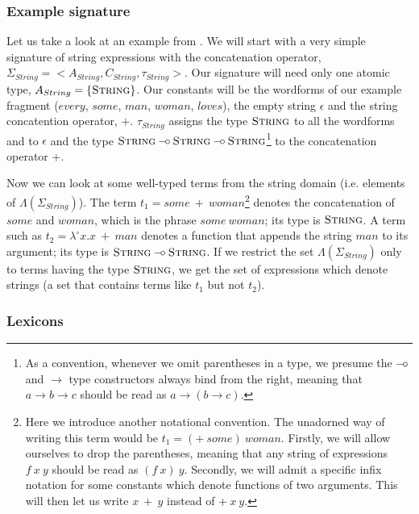 \subsubsection{Example signature}
\label{sssec:example-sig}

Let us take a look at an example from
\cite{pogodalla2007generalizing}. We will start with a very simple
signature of string expressions with the concatenation operator,
$\Sigma_{String} = \mathopen{<}A_{String}, C_{String},
\tau_{String}\mathclose{>}$. Our signature will need only one atomic
type, $A_{String} = \{\textsc{String}\}$. Our constants will be the
wordforms of our example fragment ($every$, $some$, $man$, $woman$,
$loves$), the empty string $\epsilon$ and the string concatention
operator, $+$. $\tau_{String}$ assigns the type $\textsc{String}$ to all
the wordforms and to $\epsilon$ and the type $\textsc{String} \mathbin{{-}\mkern-3.5mu{\circ}}
\textsc{String} \mathbin{{-}\mkern-3.5mu{\circ}} \textsc{String}$\footnote{As a convention,
  whenever we omit parentheses in a type, we presume the $\mathbin{{-}\mkern-3.5mu{\circ}}$ and
  $\to$ type constructors always bind from the right, meaning that $a
  \to b \to c$ should be read as $a \to (b \to c)$.}
to the concatenation operator $+$.

Now we can look at some well-typed terms from the string domain
(i.e. elements of $\Lambda(\Sigma_{String})$). The term $t_1 =
some\ +\ woman$\footnote{Here we introduce another notational
  convention. The unadorned way of writing this term would be $t_1 =
  (+\ some)\ woman$. Firstly, we will allow ourselves to drop the
  parentheses, meaning that any string of expressions $f\ x\ y$ should
  be read as $(f\ x)\ y$. Secondly, we will admit a specific infix
  notation for some constants which denote functions of two
  arguments. This will then let us write $x\ +\ y$ instead of
  $+\ x\ y$.} denotes the concatenation of $some$ and $woman$, which is
the phrase $some\ woman$; its type is $\textsc{String}$. A term such as
$t_2 = \lambda^{\circ} x. x\ +\ man$ denotes a function that appends the
string $man$ to its argument; its type is $\textsc{String} \mathbin{{-}\mkern-3.5mu{\circ}}
\textsc{String}$. If we restrict the set $\Lambda(\Sigma_{String})$ only
to terms having the type $\textsc{String}$, we get the set of
expressions which denote strings (a set that contains terms like $t_1$
but not $t_2$).

\subsubsection{Lexicons}

